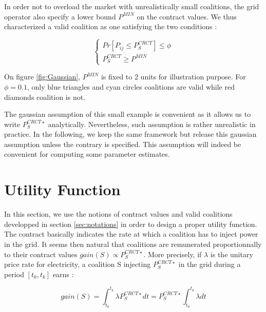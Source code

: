 \documentclass[conference]{IEEEtran}
\begin{document}
In order not to overload the market with unrealistically small coalitions, the grid operator also specify a lower bound $ P^{MIN} $ on the contract values. We thus characterized a valid coalition as one satisfying the two conditions :

\begin{equation}
\left\{ \begin{array}{lll}
			Pr[P_{ij} \leq P_{S}^{CRCT}] \leq \phi \\
			P_{S}^{CRCT} \geq P^{MIN}
\end{array} \right.
\end{equation}

On figure \ref{fig:Gaussian}, $ P^{MIN} $ is fixed to 2 units for illustration purpose. For $ \phi = 0.1 $, only blue triangles and cyan circles coalitions are valid while red diamonds coalition is not.

The gaussian assumption of this small example is convenient as it allows us to write $ P_{S}^{CRCT \star} $ analytically. Nevertheless, such assumption is rather unrealistic in practice. In the following, we keep the same framework but release this gaussian assumption unless the contrary is specified. This assumption will indeed be convenient for computing some parameter estimates.








%
%

\section{Utility Function}
\label{sec:utility}

In this section, we use the notions of contract values and valid coalitions developped in section \ref{sec:notations} in order to design a proper utility function. The contract basically indicates the rate at which a coalition has to inject power in the grid. It seems then natural that coalitions are remunerated proportionnally to their contract values $ gain(S) \propto P_{S}^{CRCT \star} $. More precisely, if $ \lambda $ is the unitary price rate for electricity, a coalition S injecting $ P_{S}^{CRCT \star} $ in the grid during a period $ [t_{0},t_{k}] $ earns :

\begin{equation}
gain(S) = \int_{t_{0}}^{t_{k}} \lambda P_{S}^{CRCT \star} dt = P_{S}^{CRCT \star} \int_{t_{0}}^{t_{k}} \lambda dt
\end{equation} 
\end{document}
